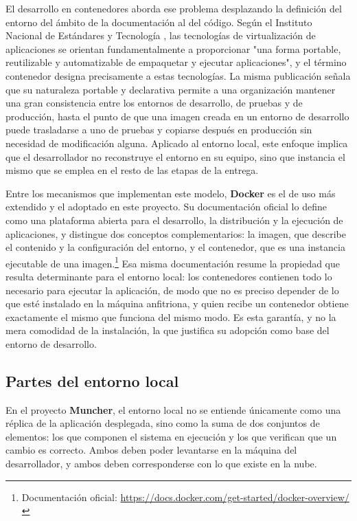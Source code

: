 El desarrollo en contenedores aborda ese problema desplazando la definición del
entorno del ámbito de la documentación al del código. Según el Instituto
Nacional de Estándares y Tecnología \cite{Souppaya2017}, las tecnologías de
virtualización de aplicaciones se orientan fundamentalmente a proporcionar "una
forma portable, reutilizable y automatizable de empaquetar y ejecutar
aplicaciones", y el término contenedor designa precisamente a estas tecnologías.
La misma publicación señala que su naturaleza portable y declarativa permite a
una organización mantener una gran consistencia entre los entornos de
desarrollo, de pruebas y de producción, hasta el punto de que una imagen creada
en un entorno de desarrollo puede trasladarse a uno de pruebas y copiarse
después en producción sin necesidad de modificación alguna. Aplicado al entorno
local, este enfoque implica que el desarrollador no reconstruye el entorno en su
equipo, sino que instancia el mismo que se emplea en el resto de las etapas de
la entrega.

Entre los mecanismos que implementan este modelo, \textbf{Docker} es el de uso
más extendido y el adoptado en este proyecto. Su documentación oficial lo define
como una plataforma abierta para el desarrollo, la distribución y la ejecución de
aplicaciones, y distingue dos conceptos complementarios: la imagen, que describe
el contenido y la configuración del entorno, y el contenedor, que es una
instancia ejecutable de una imagen.\footnote{Documentación oficial:
	\url{https://docs.docker.com/get-started/docker-overview/}} Esa misma
documentación resume la propiedad que resulta determinante para el entorno
local: los contenedores contienen todo lo necesario para ejecutar la aplicación,
de modo que no es preciso depender de lo que esté instalado en la máquina
anfitriona, y quien recibe un contenedor obtiene exactamente el mismo que
funciona del mismo modo. Es esta garantía, y no la mera comodidad de la
instalación, la que justifica su adopción como base del entorno de desarrollo.

\subsection*{Partes del entorno local}

En el proyecto \textbf{Muncher}, el entorno local no se entiende únicamente como
una réplica de la aplicación desplegada, sino como la suma de dos conjuntos de
elementos: los que componen el sistema en ejecución y los que verifican que un
cambio es correcto. Ambos deben poder levantarse en la máquina del
desarrollador, y ambos deben corresponderse con lo que existe en la nube.

